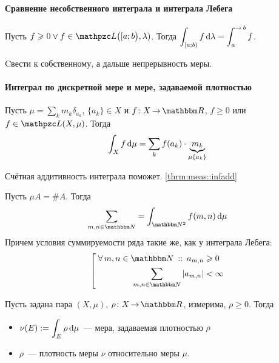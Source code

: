 \documentclass[draft, timbord]{longnotes}
\begin{document}


\paragraph{Сравнение несобственного интеграла и интеграла Лебега}
\label{par:meas::impleb}

\begin{thrm}\label{thrm:meas::impleb}
  Пусть $f \geqslant 0 \lor f \in \summb\bigl([a;b\bigr),\lambda)$. Тогда
  $\displaystyle \int_{[a;b)} f \, \del \lambda = \int _a ^{\to b} f$.
\end{thrm}
\begin{tproof}\underdev
  Cвести к собственному, а дальше непрерывность меры.
\end{tproof}

\paragraph{Интеграл по дискретной мере и мере, задаваемой плотностью}
\label{par:meas::discint}

\begin{thrm}\label{thrm:meas::discint::mol}
  Пусть $\mu = \sum_{k} m_k \delta_{a_k}$, $\{a_k\} \in X$ и  $f\colon X \to \R$, 
  $f \geqslant 0$ или $f\in \summb (X,\mu)$.
  Тогда \[
    \int_X f \, \mathrm{d} \mu = \sum_{k} f(a_k) \cdot \underbrace{m_k}_{\mu \{a_k\}}
  \]
\end{thrm}

\begin{tproof}\underdev
  Счётная аддитивность интеграла поможет. \ref{thrm:meas::infadd}
\end{tproof}


\begin{exmp}\label{exmp:meas::discint::series}
  Пусть $\mu A=\#A$. Тогда \[
    \sum_{m,n\in\N} = \int _{\N^2} f(m,n) \, \del \mu
  \]
  Причем условия суммируемости  
  ряда такие же, как у интеграла Лебега: 
  \[
    \left[\;
    \begin{aligned}
      \forall\, m,n\in \N \holds a_{m,n} &\geqslant 0 \\
      \sum_{m,n\in\N} |a_{m,n}| &< \infty \\
    \end{aligned} \right.
  \]
\end{exmp}


\begin{defn}\label{defn:meas::discint::dens}
  Пусть задана пара  
  $(X, \mu)$, $\rho \colon X \to \R$, измерима, $\rho \geqslant 0$. 
  Тогда 
  \begin{itemize}
    \item $\displaystyle \nu(E) := \int_E \rho \, \mathrm{d} \mu $~--- мера, задаваемая плотностью
      $\rho$
    \item $\rho$~--- плотность меры $\nu$ относительно меры $\mu$.
  \end{itemize}
\end{defn}
\end{document}
